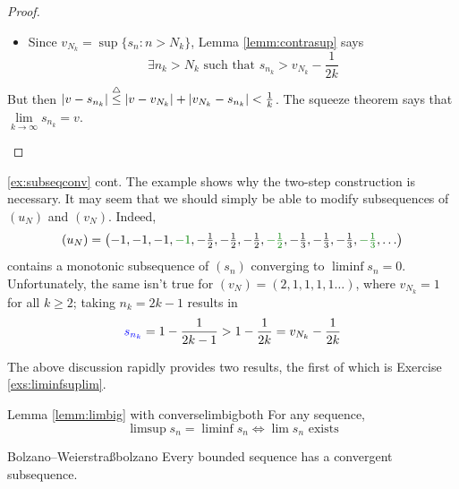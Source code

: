 \begin{proof}
\begin{description}
\begin{itemize}
		  \item Since $v_{N_k}=\sup\{s_n:n>N_k\}$, Lemma \ref{lemm:contrasup} says
		  \[\exists n_k>N_k\text{ such that }s_{n_k}>v_{N_k}-\frac 1{2k}\]
		\end{itemize}
		But then $\left| v-s_{n_k}\right|\overset{\smash{\triangle}}{\le}\left| v-v_{N_k}\right|+\left| v_{N_k}-s_{n_k}\right|<\frac 1k$. The squeeze theorem says that $\lim\limits_{k\to\infty}s_{n_k}=v$.\hfill\qedhere
	\end{description}
\end{proof}


\goodbreak


\begin{example*}{\ref{ex:subseqconv} cont.}{}
	The example shows why the two-step construction is necessary. It may seem that we should simply be able to modify subsequences of $(u_N)$ and $(v_N)$. Indeed,
	\[(u_N)=\bigl(-1,-1,-1,\textcolor{Green}{-1}, -\tfrac 12,-\tfrac 12,-\tfrac 12,\textcolor{Green}{-\tfrac 12}, -\tfrac 13,-\tfrac 13,-\tfrac 13,\textcolor{Green}{-\tfrac 13},\ldots\bigr)\]
	contains a monotonic subsequence of $(s_n)$ converging to $\liminf s_n=0$. Unfortunately, the same isn't true for $(v_N)=(2,1,1,1,1\ldots)$, where $v_{N_k}=1$ for all $k\ge 2$; taking $n_k=2k-1$ results in
	\[\textcolor{blue}{s_{n_k}}=1-\frac 1{2k-1}>1-\frac 1{2k} =v_{N_k}-\frac 1{2k}\]
\end{example*}


The above discussion rapidly provides two results, the first of which is Exercise \ref{exs:liminfsuplim}.

\begin{thm}{Lemma \ref{lemm:limbig} with converse}{limbigboth}
	For any sequence,
	\[\limsup s_n=\liminf s_n \iff \lim s_n\text{ exists} \]
\end{thm}



\begin{thm}{Bolzano--Weierstraß}{bolzano}
	Every bounded sequence has a convergent subsequence.
\end{thm}

